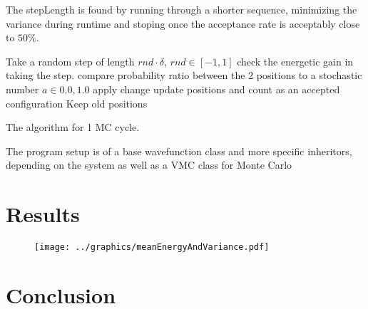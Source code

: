 \documentclass[10pt]{revtex4-1}
\begin{document}
The stepLength is found by running through a shorter sequence, minimizing the variance during runtime and stoping once the acceptance rate is
acceptably close to $50\%$.
\begin{algorithm}
    \begin{algorithmic}[1]
            \State Take a random step of length $rnd \cdot \delta$, $rnd \in [-1,1]$
            \State check the energetic gain in taking the step.
            \State compare probability ratio between the 2 positions to a stochastic number $a \in {0.0, 1.0}$
                \State apply change
                \State update positions and count
                \State as an accepted configuration
            \Else
                \State Keep old positions
            \EndIf
        \EndFor
    \EndFor
    \end{algorithmic}
    \caption{The algorithm for 1 MC cycle. }
\end{algorithm}

The program setup is of a base wavefunction class and more specific inheritors, depending on the system as well as a VMC class for Monte Carlo

\section{Results}


\begin{figure}[hbtp]
\texttt{[image: ../graphics/meanEnergyAndVariance.pdf]}
\caption{}
\end{figure}

\section{Conclusion}
\end{document}
